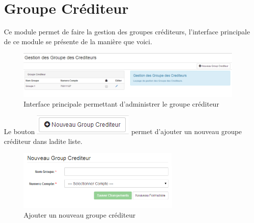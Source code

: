 \documentclass[12pt,a4paper]{report}
\begin{document}
\section{Groupe Créditeur}
Ce module permet de faire la gestion des groupes créditeurs, l'interface principale de ce module se présente de la manière que voici.

\begin{figure}[h]
\begin{center}
\includegraphics[width=12cm]{pic/AdminGroupCredit.png}
\end{center}
\caption{Interface principale permettant d'administrer le groupe créditeur}
\label{Interface principale permettant d'administrer le groupe créditeur}
\end{figure}


Le bouton \includegraphics[scale=0.7]{pic/NewGroupCredit.png} permet d'ajouter un nouveau groupe créditeur dans ladite liste.

\begin{figure}[h]
\begin{center}
\includegraphics[width=8cm]{pic/AddNewGroupCred.png}
\end{center}
\caption{Ajouter un nouveau groupe créditeur}
\label{Ajouter un nouveau groupe créditeur}
\end{figure}
\end{document}
